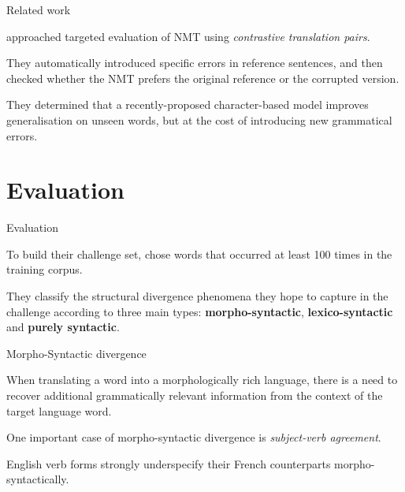 \documentclass{beamer}
\begin{document}
\begin{frame}{Related work}

  \textcite{sennrich2016grammatical} approached targeted evaluation of NMT using \textit{contrastive translation pairs}.

  \medskip

  They automatically introduced specific errors in reference sentences, and then checked whether the NMT prefers the original reference or the corrupted version.

  \medskip

  They determined that a recently-proposed character-based model improves generalisation on unseen words, but at the cost of introducing new grammatical errors.

\end{frame}

\section{Evaluation}
\begin{frame}{Evaluation}

  To build their challenge set, \textcite{isabelle2017challenge} chose words that occurred at least 100 times in the training corpus.

  \medskip

  They classify the structural divergence phenomena they hope to capture in the challenge according to three main types: \textbf{morpho-syntactic}, \textbf{lexico-syntactic} and \textbf{purely syntactic}.

\end{frame}

\begin{frame}{Morpho-Syntactic divergence}

  When translating a word into a morphologically rich language, there is a need to recover additional grammatically relevant information from the context of the target language word.

  \medskip

  One important case of morpho-syntactic divergence is \textit{subject-verb agreement}.

  \medskip

  English verb forms strongly underspecify their French counterparts morpho-syntactically.

\end{frame}
\end{document}
